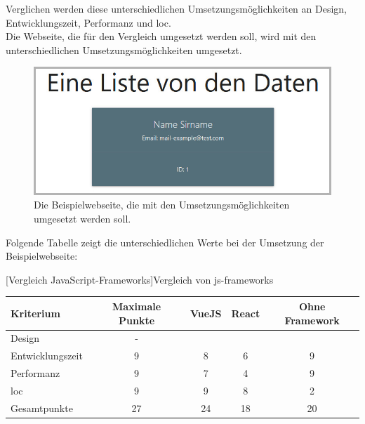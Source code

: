Verglichen werden diese unterschiedlichen Umsetzungsmöglichkeiten an Design, Entwicklungszeit, Performanz und \Gls{loc}.\\
Die Webseite, die für den Vergleich umgesetzt werden soll, wird mit den unterschiedlichen Umsetzungsmöglichkeiten umgesetzt.\\
\begin{figure}[H]
	\centering
	\includegraphics[width=0.8\linewidth]{images/rfoster_study/example_page}
	\caption[Die Beispielwebseite]{Die Beispielwebseite, die mit den Umsetzungsmöglichkeiten umgesetzt werden soll.}
	\label{fig:example}
\end{figure}
Folgende Tabelle zeigt die unterschiedlichen Werte bei der Umsetzung der Beispielwebseite:
\begin{table}
	[Vergleich JavaScript-Frameworks]{Vergleich von \Gls{js}-\Gls{framework}s}\label{tab:vergleich}
	\centering
	\label{center}
	\begin{tabular}{l|c|c|c|c}
		Kriterium        & Maximale Punkte & VueJS & React & Ohne Framework  \\\hline
		Design           & -                        &            \checkmark               &             \checkmark              &          \checkmark                           \\
		Entwicklungszeit & 9                         &             8              &               6            &               9                      \\
		Performanz       & 9                         &             7              &               4            &                 9                    \\
		\Gls{loc}              & 9                         &             9              &               8            &                   2                  \\
		Gesamtpunkte     & 27                         &              24             &               18            &                20                    
	\end{tabular}
\end{table}
